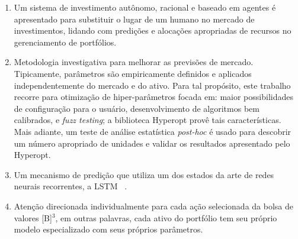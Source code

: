  \begin{enumerate}
  \item \label{ASPECT:1} Um sistema de investimento autônomo, racional e baseado em agentes é apresentado para substituir o lugar de um humano no mercado de investimentos, lidando com predições e alocações apropriadas de recursos no gerenciamento de portfólios.
  
  \item \label{ASPECT:2} Metodologia investigativa para melhorar as previsões de mercado. Tipicamente, parâmetros são empiricamente definidos e aplicados independentemente do mercado e do ativo. Para tal propósito, este trabalho recorre para otimização de hiper-parâmetros focada em: maior possibilidades de configuração para o usuário, desenvolvimento de algoritmos bem calibrados, e \emph{fuzz testing}; a biblioteca Hyperopt \cite{hyperopt} provê tais características. Mais adiante, um teste de análise estatística \textit{post-hoc} é usado para descobrir um número apropriado de unidades e validar os resultados apresentado pelo Hyperopt.
  
  \item \label{ASPECT:3} Um mecanismo de predição que utiliza um dos estados da arte de redes neurais recorrentes, a LSTM ~\cite{ga_optimized_lstm}.
  
  \item \label{ASPECT:4} Atenção direcionada individualmente para cada ação selecionada da bolsa de valores [B]$^3$, em outras palavras, cada ativo do portfólio tem seu próprio modelo especializado com seus próprios parâmetros.
\end{enumerate}

